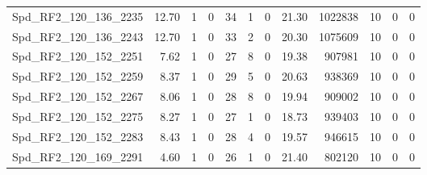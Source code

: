 \begin{longtable}[c]{@{}lrrrrrrrrrrr@{}}
Spd\_RF2\_120\_136\_2235      & 12.70                  & 1                       & 0                       & 34                     & 1                       & 0                       & 21.30                   & 1022838                  & 10                       & 0                        & 0                        \\
Spd\_RF2\_120\_136\_2243      & 12.70                  & 1                       & 0                       & 33                     & 2                       & 0                       & 20.30                   & 1075609                  & 10                       & 0                        & 0                        \\
Spd\_RF2\_120\_152\_2251      & 7.62                   & 1                       & 0                       & 27                     & 8                       & 0                       & 19.38                   & 907981                   & 10                       & 0                        & 0                        \\
Spd\_RF2\_120\_152\_2259      & 8.37                   & 1                       & 0                       & 29                     & 5                       & 0                       & 20.63                   & 938369                   & 10                       & 0                        & 0                        \\
Spd\_RF2\_120\_152\_2267      & 8.06                   & 1                       & 0                       & 28                     & 8                       & 0                       & 19.94                   & 909002                   & 10                       & 0                        & 0                        \\
Spd\_RF2\_120\_152\_2275      & 8.27                   & 1                       & 0                       & 27                     & 1                       & 0                       & 18.73                   & 939403                   & 10                       & 0                        & 0                        \\
Spd\_RF2\_120\_152\_2283      & 8.43                   & 1                       & 0                       & 28                     & 4                       & 0                       & 19.57                   & 946615                   & 10                       & 0                        & 0                        \\
Spd\_RF2\_120\_169\_2291      & 4.60                   & 1                       & 0                       & 26                     & 1                       & 0                       & 21.40                   & 802120                   & 10                       & 0                        & 0                        \\

\end{longtable}
